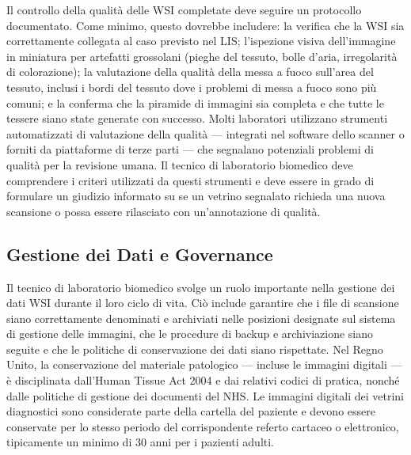 Il controllo della qualità delle WSI completate deve seguire un protocollo documentato. Come minimo, questo dovrebbe includere: la verifica che la WSI sia correttamente collegata al caso previsto nel LIS; l'ispezione visiva dell'immagine in miniatura per artefatti grossolani (pieghe del tessuto, bolle d'aria, irregolarità di colorazione); la valutazione della qualità della messa a fuoco sull'area del tessuto, inclusi i bordi del tessuto dove i problemi di messa a fuoco sono più comuni; e la conferma che la piramide di immagini sia completa e che tutte le tessere siano state generate con successo. Molti laboratori utilizzano strumenti automatizzati di valutazione della qualità --- integrati nel software dello scanner o forniti da piattaforme di terze parti --- che segnalano potenziali problemi di qualità per la revisione umana. Il tecnico di laboratorio biomedico deve comprendere i criteri utilizzati da questi strumenti e deve essere in grado di formulare un giudizio informato su se un vetrino segnalato richieda una nuova scansione o possa essere rilasciato con un'annotazione di qualità.

\subsection{Gestione dei Dati e Governance}

Il tecnico di laboratorio biomedico svolge un ruolo importante nella gestione dei dati WSI durante il loro ciclo di vita. Ciò include garantire che i file di scansione siano correttamente denominati e archiviati nelle posizioni designate sul sistema di gestione delle immagini, che le procedure di backup e archiviazione siano seguite e che le politiche di conservazione dei dati siano rispettate. Nel Regno Unito, la conservazione del materiale patologico --- incluse le immagini digitali --- è disciplinata dall'Human Tissue Act 2004 e dai relativi codici di pratica, nonché dalle politiche di gestione dei documenti del NHS. Le immagini digitali dei vetrini diagnostici sono considerate parte della cartella del paziente e devono essere conservate per lo stesso periodo del corrispondente referto cartaceo o elettronico, tipicamente un minimo di 30 anni per i pazienti adulti.

